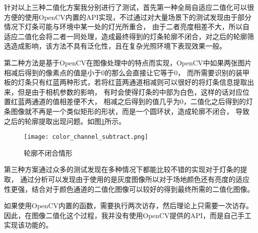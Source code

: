 针对以上三种二值化方案我分别进行了测试，首先第一种全局自适应二值化可以很方便的使用OpenCV内置的API实现，不过通过对大量场景下的测试发现由于部分情况下灯条可能与环境中某一处的灯光所重合，
由于二者亮度相差不大，所以自适应二值化会将二者一同处理，造成最终得到的灯条轮廓不闭合，对之后的轮廓筛选造成影响，该方法不具有泛化性，且在复杂光照环境下表现效果一般。\par

第二种方法是基于OpenCV在图像处理中的特点而实现，OpenCV中如果两张图片相减后得到的像素点的值是小于0的那么会直接让它等于0，
而所需要识别的装甲板的灯条只有红蓝两种形式，若将红蓝两通道相减则可以很好的将灯条信息提取出来，但是由于相机参数的影响，
有时会使得灯条的中部为白色，这样的话对应位置红蓝两通道的值相差便不大，
相减之后得到的值几乎为0，二值化之后得到的灯条图像就不再是一个类似矩形的形状，而是一个圆环状，造成轮廓不闭合，
导致之后的轮廓提取出现问题。如图\ref{轮廓不闭合情形}所示。\par
\begin{figure}[H]
    \centering
    \texttt{[image: color\_channel\_subtract.png]} 
    \caption{轮廓不闭合情形} 
    \label{轮廓不闭合情形}
\end{figure}


第三种方案通过众多的测试发现在多种情况下都能比较不错的实现对于灯条的提取，
通过分析可以发现由于使用的是灰度图像所以对于场地颜色还有亮度的适应性更强，结合对于颜色通道的二值化图像可以较好的得到最终所需的二值化图像。\par

如果使用OpenCV内置的函数，需要执行两次访存，然后理论上只需要一次访存。因此，在图像二值化这个过程，我并没有使用OpenCV提供的API，而是自己手工实现该功能的。

